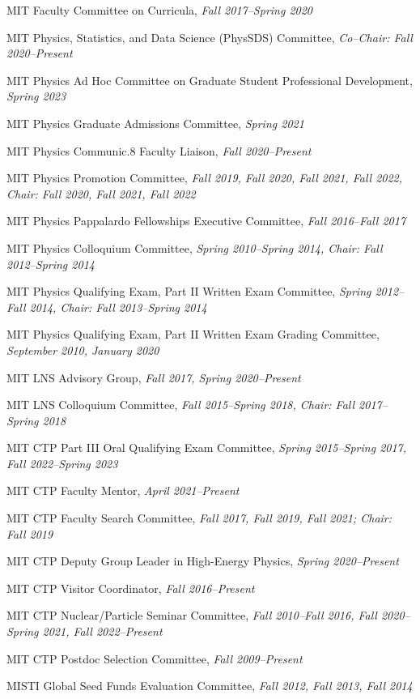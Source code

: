 \bbl
\item MIT Faculty Committee on Curricula, \emph{Fall 2017--Spring 2020}
\item MIT Physics, Statistics, and Data Science (PhysSDS) Committee, \emph{Co--Chair: Fall 2020--Present}
\item MIT Physics Ad Hoc Committee on Graduate Student Professional Development, \emph{Spring 2023}
\item MIT Physics Graduate Admissions Committee, \emph{Spring 2021}
\item MIT Physics Communic.8 Faculty Liaison, \emph{Fall 2020--Present}
\item MIT Physics Promotion Committee, \emph{Fall 2019, Fall 2020, Fall 2021, Fall 2022, Chair: Fall 2020, Fall 2021, Fall 2022}
\item MIT Physics Pappalardo Fellowships Executive Committee, \emph{Fall 2016--Fall 2017}
\item MIT Physics Colloquium Committee, \emph{Spring 2010--Spring 2014, Chair: Fall 2012--Spring 2014}
\item MIT Physics Qualifying Exam, Part II Written Exam Committee, \emph{Spring 2012--Fall 2014, Chair: Fall 2013--Spring 2014}
\item MIT Physics Qualifying Exam, Part II Written Exam Grading Committee, \emph{September 2010, January 2020}
\item MIT LNS Advisory Group, \emph{Fall 2017, Spring 2020--Present}
\item MIT LNS Colloquium Committee, \emph{Fall 2015--Spring 2018, Chair: Fall 2017--Spring 2018}
\item MIT CTP Part III Oral Qualifying Exam Committee, \emph{Spring 2015--Spring 2017, Fall 2022--Spring 2023}
\item MIT CTP Faculty Mentor, \emph{April 2021--Present}
\item MIT CTP Faculty Search Committee, \emph{Fall 2017, Fall 2019, Fall 2021; Chair: Fall 2019}
\item MIT CTP Deputy Group Leader in High-Energy Physics, \emph{Spring 2020--Present}
\item MIT CTP Visitor Coordinator, \emph{Fall 2016--Present}
\item MIT CTP Nuclear/Particle Seminar Committee, \emph{Fall 2010--Fall 2016, Fall 2020--Spring 2021, Fall 2022--Present}
\item MIT CTP Postdoc Selection Committee, \emph{Fall 2009--Present}
\item MISTI Global Seed Funds Evaluation Committee, \emph{Fall 2012, Fall 2013, Fall 2014}
\el
